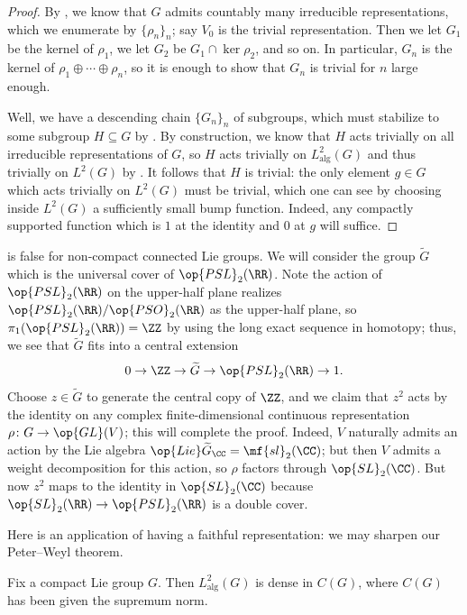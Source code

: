 \documentclass[../notes.tex]{subfiles}
\begin{document}
\begin{proof}
	By , we know that $G$ admits countably many irreducible representations, which we enumerate by $\{\rho_n\}_n$; say $V_0$ is the trivial representation. Then we let $G_1$ be the kernel of $\rho_1$, we let $G_2$ be $G_1\cap\ker\rho_2$, and so on. In particular, $G_n$ is the kernel of $\rho_1\oplus\cdots\oplus\rho_n$, so it is enough to show that $G_n$ is trivial for $n$ large enough.
	
	Well, we have a descending chain $\{G_n\}_n$ of subgroups, which must stabilize to some subgroup $H\subseteq G$ by . By construction, we know that $H$ acts trivially on all irreducible representations of $G$, so $H$ acts trivially on $L^2_{\mathrm{alg}}(G)$ and thus trivially on $L^2(G)$ by . It follows that $H$ is trivial: the only element $g\in G$ which acts trivially on $L^2(G)$ must be trivial, which one can see by choosing inside $L^2(G)$ a sufficiently small bump function. Indeed, any compactly supported function which is $1$ at the identity and $0$ at $g$ will suffice.
\end{proof}
\begin{example}
	 is false for non-compact connected Lie groups. We will consider the group $\widetilde G$ which is the universal cover of $\op{PSL}_2(\RR)$. Note the action of $\op{PSL}_2(\RR)$ on the upper-half plane realizes $\op{PSL}_2(\RR)/\op{PSO}_2(\RR)$ as the upper-half plane, so $\pi_1(\op{PSL}_2(\RR))=\ZZ$ by using the long exact sequence in homotopy; thus, we see that $\widetilde G$ fits into a central extension
	\[0\to\ZZ\to\widetilde G\to\op{PSL}_2(\RR)\to1.\]
	Choose $z\in\widetilde G$ to generate the central copy of $\ZZ$, and we claim that $z^2$ acts by the identity on any complex finite-dimensional continuous representation $\rho\colon G\to\op{GL}(V)$; this will complete the proof. Indeed, $V$ naturally admits an action by the Lie algebra $\op{Lie}\widetilde G_\CC=\mf{sl}_2(\CC)$; but then $V$ admits a weight decomposition for this action, so $\rho$ factors through $\op{SL}_2(\CC)$. But now $z^2$ maps to the identity in $\op{SL}_2(\CC)$ because $\op{SL}_2(\RR)\to\op{PSL}_2(\RR)$ is a double cover.
\end{example}
Here is an application of having a faithful representation: we may sharpen our Peter--Weyl theorem.
\begin{corollary} \label{cor:l2-alg-dense}
	Fix a compact Lie group $G$. Then $L^2_{\mathrm{alg}}(G)$ is dense in $C(G)$, where $C(G)$ has been given the supremum norm.
\end{corollary}
\end{document}
